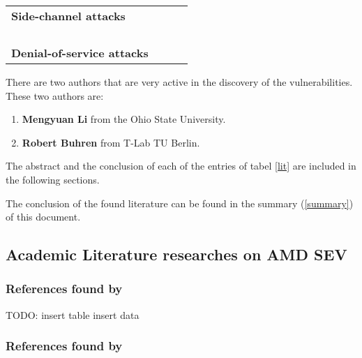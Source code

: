 \begin{table}[ht]
{\begin{tabular}{|p{3.5cm}|p{3.5cm}|p{3.5cm}|p{3.5cm}|}
    \textbf{Side-channel attacks} 
    & \begin{minipage}[t]{7cm}
        \cite{li_crossline_2021}\\ 
        \cite{li_cipherleaks_2021}\\ 
        \cite{mestas_exploitation_2021} 
      \end{minipage}
    & \begin{minipage}[t]{7cm}
        \cite{li_crossline_2021}\\
        \cite{li_cipherleaks_2021}\\
        \cite{mestas_exploitation_2021} 
      \end{minipage}
    & 
    \\

    \textbf{Denial-of-service attacks} 
    & 
    & 
    & 
    \\
    \hline

  \end{tabular}
}
\end{table}

There are two authors that are very active in the discovery of the vulnerabilities. 
These two authors are: 
\begin{enumerate}
  \item \textbf{Mengyuan Li} from the Ohio State University.  
  \item \textbf{Robert Buhren} from T-Lab TU  Berlin.
\end{enumerate}

The abstract and the conclusion of each of the entries of tabel \ref{lit}
are included in the following sections.

The conclusion of the found literature can be found in the summary (\ref{summary}) of this document.

\newpage
\subsection{Academic Literature researches on AMD SEV}

\subsubsection{References found by \cite{2019-werner} }

TODO:  insert table insert data

\subsubsection{References found by \cite{leijonberg_viability_2021} }

